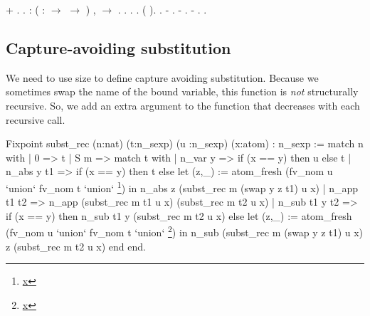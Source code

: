 \begin{coqdoccode}
\coqdocindent{2.00em}
+ .\coqdoceol
\coqdocnoindent
{}.\coqdoceol
\coqdocemptyline
\coqdocemptyline
\coqdocemptyline
\coqdocnoindent
{}  : \coqdockw{\ensuremath{\forall}} ( :  \ensuremath{\rightarrow}  \ensuremath{\rightarrow} )  ,\coqdoceol
\coqdocindent{2.00em}
   \ensuremath{\rightarrow}    .\coqdoceol
\coqdocnoindent
{}.\coqdoceol
\coqdocindent{1.00em}
.   .  (     ).\coqdoceol
\coqdocindent{1.00em}
 .\coqdoceol
\coqdocindent{1.00em}
-  .\coqdoceol
\coqdocindent{1.00em}
- .\coqdoceol
\coqdocindent{1.00em}
-  .\coqdoceol
\coqdocnoindent
{}.\coqdoceol
\coqdocemptyline
\coqdocemptyline
\end{coqdoccode}
\subsection{Capture-avoiding substitution}



 We need to use size to define capture avoiding
    substitution. Because we sometimes swap the name of the
    bound variable, this function is \textit{not} structurally
    recursive. So, we add an extra argument to the function
    that decreases with each recursive call. 


Fixpoint subst\_rec (n:nat) (t:n\_sexp) (u :n\_sexp) (x:atom)  : n\_sexp :=
  match n with
  | 0 => t
  | S m => match t with
          | n\_var y =>
            if (x == y) then u else t
          | n\_abs y t1 =>
            if (x == y) then t
            else
                            let (z,\_) :=
                  atom\_fresh (fv\_nom u `union` fv\_nom t `union` \footnote{\url{x}}) in
                 n\_abs z (subst\_rec m (swap y z t1) u x)
          | n\_app t1 t2 =>
            n\_app (subst\_rec m t1 u x) (subst\_rec m t2 u x)
          | n\_sub t1 y t2 =>
            if (x == y) then n\_sub t1 y (subst\_rec m t2 u x)
            else
                            let (z,\_) :=
                  atom\_fresh (fv\_nom u `union` fv\_nom t `union` \footnote{\url{x}}) in
                 n\_sub  (subst\_rec m (swap y z t1) u x) z (subst\_rec m t2 u x) 
           end
  end. 

